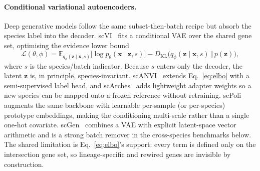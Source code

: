 \documentclass[10pt,twocolumn]{article}
\begin{document}
\paragraph{Conditional variational autoencoders.}
Deep generative models follow the same subset-then-batch recipe but absorb the
species label into the decoder. scVI~\cite{lopez2018} fits a conditional VAE over
the shared gene set, optimising the evidence lower bound
\begin{equation}
\mathcal{L}(\theta,\phi) = \mathbb{E}_{q_\phi(\mathbf z\mid \mathbf x,s)}
\!\big[\log p_\theta(\mathbf x\mid \mathbf z,s)\big]
- D_{\mathrm{KL}}\!\big(q_\phi(\mathbf z\mid \mathbf x,s)\,\Vert\,p(\mathbf z)\big),
\label{eq:elbo}
\end{equation}
where $s$ is the species/batch indicator. Because $s$ enters only the decoder, the
latent $\mathbf z$ is, in principle, species-invariant. scANVI~\cite{xu2021} extends
Eq.~\eqref{eq:elbo} with a semi-supervised label head, and scArches~\cite{lotfollahi2022}
adds lightweight adapter weights so a new species can be mapped onto a frozen
reference without retraining. scPoli~\cite{dedonno2023} augments the same backbone
with learnable per-sample (or per-species) prototype embeddings, making the
conditioning multi-scale rather than a single one-hot covariate. scGen~\cite{lotfollahi2019}
combines a VAE with explicit latent-space vector arithmetic and is a strong batch
remover in the cross-species benchmarks below. The shared limitation is
Eq.~\eqref{eq:elbo}'s support: every term is defined only on the intersection gene
set, so lineage-specific and rewired genes are invisible by construction.
\end{document}
